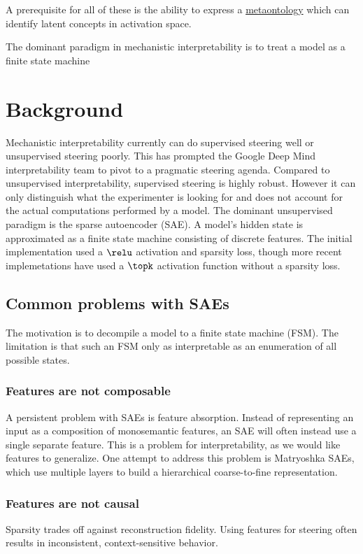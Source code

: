 A prerequisite for all of these is the ability to express a 
\href{https://plato.stanford.edu/entries/ontological-commitment/}{metaontology}
which can identify latent concepts in activation space.

The dominant paradigm in mechanistic interpretability is to treat a model as a finite state
machine

\section{Background}
Mechanistic interpretability currently can do supervised steering well or unsupervised steering poorly. 
This has prompted the Google Deep Mind interpretability team to pivot to a pragmatic steering 
agenda\cite{gdmprogress2025}. 
Compared to unsupervised interpretability, supervised steering is highly robust.
However it can only distinguish what the experimenter is looking for
and does not account for the actual computations performed by a model\cite{makelov2023}.
The dominant unsupervised paradigm is the sparse autoencoder (SAE).
A model's hidden state is approximated as a finite state machine consisting of discrete features.
The initial implementation used a $\relu$ activation and sparsity loss\cite{bricken2023},
though more recent implemetations have used a $\topk$ activation function without a sparsity loss\cite{gao2024}.

\subsection{Common problems with SAEs}
The motivation is to decompile a model to a finite state machine (FSM). 
The limitation is that such an FSM only as interpretable as an enumeration of all possible states.

\subsubsection{Features are not composable}
A persistent problem with SAEs is feature absorption\cite{chanin2025}.
Instead of representing an input as a composition of monosemantic features,
an SAE will often instead use a single separate feature.
This is a problem for interpretability, as we would like features to generalize.
One attempt to address this problem is Matryoshka SAEs\cite{bussmann2025},
which use multiple layers to build a hierarchical coarse-to-fine representation.

\subsubsection{Features are not causal}
Sparsity trades off against reconstruction fidelity.
Using features for steering often results in inconsistent, context-sensitive behavior\cite{duan2026}.


